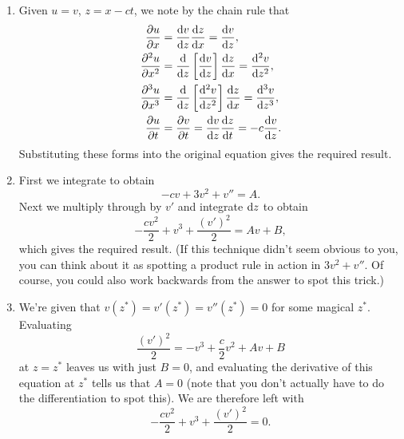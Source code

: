 \documentclass[a4paper, 12pt]{article}
\begin{document}
\begin{enumerate}[label={\bf \arabic{*}.\;}, ref={\arabic{*}},itemsep=3ex, left=0ex]
{\begin{enumerate}[label=(\alph*)]
      \end{enumerate}
    }
    {
      \begin{enumerate}[label=(\alph*)]
        \item{
            Given $u=v$, $z=x-ct$, we note by the chain rule that
            \begin{subequations}
              \begin{align}
                \pd{u}{x} &= \fd{v}{z}\fd{z}{x} = \fd{v}{z},\\
                \pdd{u}{x} &= \fd{}{z}\left[\fd{v}{z}\right]\fd{z}{x} = \fdd{v}{z},\\
                \pddd{u}{x} &= \fd{}{z}\left[\fdd{v}{z}\right]\fd{z}{x} = \fddd{v}{z},\\
                \pd{u}{t} &= \pd{v}{t} = \fd{v}{z}\fd{z}{t} = -c\fd{v}{z}.
              \end{align}
            \end{subequations}
            Substituting these forms into the original equation gives the required result.
          }
        \item{
            First we integrate to obtain
            \begin{equation}
              -cv + 3v^2 + v''= A.
            \end{equation}
            Next we multiply through by $v'$ and integrate ${\mathrm d} z$ to obtain
            \begin{equation}
              -\frac{cv^2}{2} +v^3 + \frac{(v')^2}{2}= Av + B,
            \end{equation}
            which gives the required result. (If this technique didn't seem obvious to you, you can think about it as spotting a product rule in action in $3v^2+v''$. Of course, you could also work backwards from the answer to spot this trick.)
          }
        \item{
            We're given that $v(z^*)=v'(z^*)=v''(z^*)=0$ for some magical $z^*$. Evaluating
            \begin{equation}
              \frac{(v')^2}{2} = -v^3 + \frac{c}{2}v^2 + Av + B
            \end{equation}
            at $z=z^*$ leaves us with just $B=0$, and evaluating the derivative of this equation at $z^*$ tells us that $A=0$ (note that you don't actually have to do the differentiation to spot this). We are therefore left with
            \begin{equation}
              -\frac{cv^2}{2} +v^3 + \frac{(v')^2}{2}= 0.
            \end{equation}
}
\end{enumerate}}
\end{enumerate}
\end{document}
